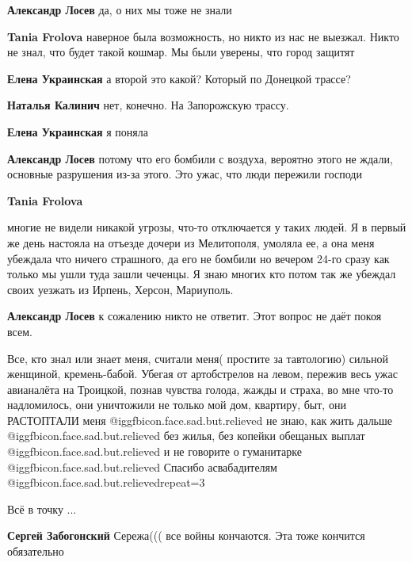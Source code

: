 \begin{itemize}
\begin{itemize}
\textbf{Александр Лосев} да, о них мы тоже не знали

\textbf{Tania Frolova} наверное была возможность, но никто из нас не выезжал. Никто не знал, что будет такой кошмар. Мы были уверены, что город защитят

\textbf{Елена Украинская} а второй это какой? Который по Донецкой трассе?

\textbf{Наталья Калинич} нет, конечно. На Запорожскую трассу.

\textbf{Елена Украинская} я поняла

\textbf{Александр Лосев} потому что его бомбили с воздуха, вероятно этого не ждали, основные разрушения из-за этого. Это ужас, что люди пережили господи

\textbf{Tania Frolova} 

многие не видели никакой угрозы, что-то отключается у таких людей. Я в первый
же день настояла на отъезде дочери из Мелитополя, умоляла ее, а она меня
убеждала что ничего страшного, да его не бомбили но вечером 24-го сразу как
только мы ушли туда зашли чеченцы. Я знаю многих кто потом так же убеждал своих
уезжать из Ирпень, Херсон, Мариуполь.

\textbf{Александр Лосев} к сожалению никто не ответит. Этот вопрос не даёт покоя всем.

\end{itemize} %


Все, кто знал или знает меня, считали меня( простите за тавтологию) сильной
женщиной, кремень-бабой. Убегая от артобстрелов на левом, пережив весь ужас
авианалёта на Троицкой, познав чувства голода, жажды и страха, во мне что-то
надломилось, они уничтожили не только мой дом, квартиру, быт, они РАСТОПТАЛИ
меня @igg{fbicon.face.sad.but.relieved}  не знаю, как жить дальше
@igg{fbicon.face.sad.but.relieved}  без жилья, без копейки обещаных выплат
@igg{fbicon.face.sad.but.relieved}  и не говорите о гуманитарке
@igg{fbicon.face.sad.but.relieved}  Спасибо асвабадителям
@igg{fbicon.face.sad.but.relieved}{repeat=3} 

Всё в точку
...

\begin{itemize} %
\textbf{Сергей Забогонский} Сережа((( все войны кончаются. Эта тоже кончится обязательно
\end{itemize} %


\end{itemize}

